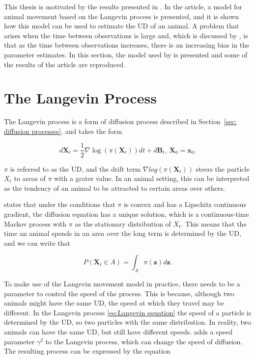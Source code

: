 
This thesis is motivated by the results presented in \parencite{michelot_langevin_2019}. In the article, a model for animal movement based on the Langevin process is presented, and it is shown how this model can be used to estimate the UD of an animal. A problem that arises when the time between observations is large and, which is discussed by \parencite{michelot_langevin_2019}, is that as the time between observations increases, there is an increasing bias in the parameter estimates. In this section, the model used by \parencite{michelot_langevin_2019} is presented and some of the results of the article are reproduced.



\section{The Langevin Process}
The Langevin process is a form of diffusion process described in Section~\ref{sec: diffusion processes}, and takes the form

\begin{equation}
    d\textbf{X}_t = \frac{1}{2} \nabla \log(\pi(\textbf{X}_t))dt + d\textbf{B}_t, \ \textbf{X}_0 = \textbf{x}_0.
    \label{eq:Langevin equation}
\end{equation}


$\pi$ is referred to as the UD, and the drift term $\nabla log(\pi(\textbf{X}_t))$ steers the particle $X_t$ to areas of $\pi$ with a grater value. In an animal setting, this can be interpreted as the tendency of an animal to be attracted to certain areas over others.



\parencite{dalalyan_theoretical_2017} states that under the conditions that $\pi$ is convex and has a Lipschitz continuous gradient, the diffusion equation has a unique solution, which is a continuous-time Markov process with $\pi$ as the stationary distribution of $X_t$. This means that the time an animal spends in an area over the long term is determined by the UD, and we can write that

\begin{equation}
    P(\textbf{X}_t \in A ) = \int_A \pi(\textbf{z})d\textbf{z}.
\end{equation}


To make use of the Langevin movement model in practice, there needs to be a parameter to control the speed of the process. This is because, although two animals might have the same UD, the speed at which they travel may be different. In the Langevin process \eqref{eq:Langevin equation} the speed of a particle is determined by the UD, so two particles with the same distribution. In reality, two animals can have the same UD, but still have different speeds. \parencite{roberts_optimal_1998} adds a speed parameter $\gamma^2$ to the Langevin process, which can change the speed of diffusion. The resulting process can be expressed by the equation

